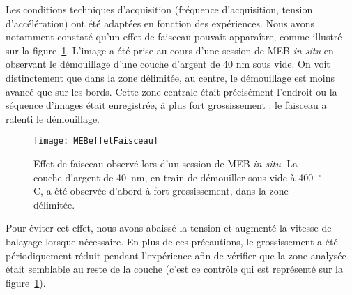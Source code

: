 Les conditions techniques d'acquisition (fréquence d'acquisition, tension d'accélération) ont été adaptées en fonction des expériences. Nous avons notamment constaté qu'un effet de faisceau pouvait apparaître, comme illustré sur la figure~\ref{MEBeffetFaisceau}. L'image a été prise au cours d'une session de MEB \textit{in situ} en observant le démouillage d'une couche d'argent de 40 nm sous vide. On voit distinctement que dans la zone délimitée, au centre, le démouillage est moins avancé que sur les bords. Cette zone centrale était précisément l'endroit ou la séquence d'images était enregistrée, à plus fort grossissement : le faisceau a ralenti le démouillage.\par 
\begin{figure}[!htb]
\centering
\texttt{[image: MEBeffetFaisceau]}
\caption{Effet de faisceau observé lors d'un session de MEB \textit{in situ}. La couche d'argent de 40~nm, en train de démouiller sous vide à 400~$^\circ$C, a été observée d'abord à fort grossissement, dans la zone délimitée.}
\label{MEBeffetFaisceau}
\end{figure}
Pour éviter cet effet, nous avons abaissé la tension et augmenté la vitesse de balayage lorsque nécessaire. En plus de ces précautions, le grossissement a été périodiquement réduit pendant l'expérience afin de vérifier que la zone analysée était semblable au reste de la couche (c'est ce contrôle qui est représenté sur la figure~\ref{MEBeffetFaisceau}).\par 
